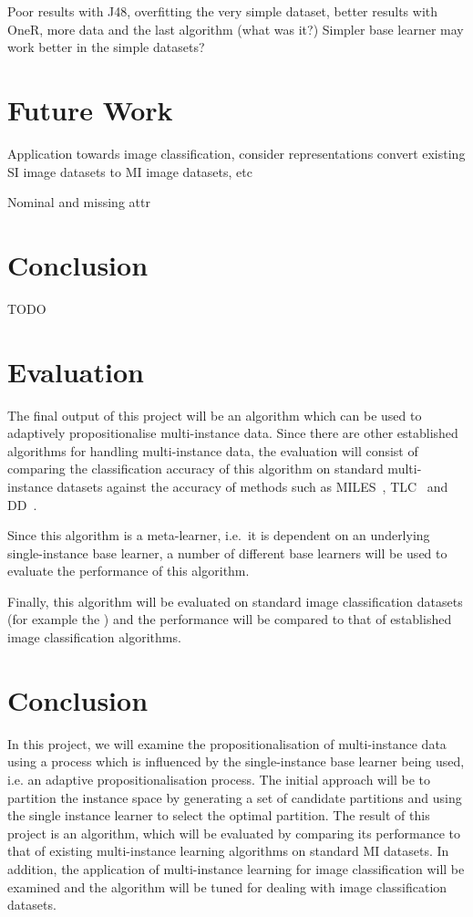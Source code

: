 \documentclass[a4paper,12pt]{article} %
\begin{document}
Poor results with J48, overfitting the very simple dataset, better results with 
    OneR, more data and the last algorithm (what was it?)
Simpler base learner may work better in the simple datasets?


\section{Future Work}
Application towards image classification, consider representations
    convert existing SI image datasets to MI image datasets, etc

Nominal and missing attr

\section{Conclusion}
TODO


\section{Evaluation}

The final output of this project will be an algorithm which can be used to adaptively propositionalise multi-instance data. Since there are other established algorithms for handling multi-instance data, the evaluation will consist of comparing the classification accuracy of this algorithm on standard multi-instance datasets against the accuracy of methods such as MILES~\cite{Chen2006}, TLC~\cite{Weidmann2003} and DD~\cite{Maron98mil}.

Since this algorithm is a meta-learner, i.e.\ it is dependent on an underlying single-instance base learner, a number of different base learners will be used to evaluate the performance of this algorithm.
 
Finally, this algorithm will be evaluated on standard image classification datasets (for example the ) and the performance will be compared to that of established image classification algorithms.

\section{Conclusion}

In this project, we will examine the propositionalisation of multi-instance data using a process which is influenced by the single-instance base learner being used, i.e. an adaptive propositionalisation process. The initial approach will be to partition the instance space by generating a set of candidate partitions and using the single instance learner to select the optimal partition. 
The result of this project is an algorithm, which will be evaluated by comparing its performance to that of existing multi-instance learning algorithms on standard MI datasets. 
In addition, the application of multi-instance learning for image classification will be examined and the algorithm will be tuned for dealing with image classification datasets.
\clearpage
 

\end{document}
